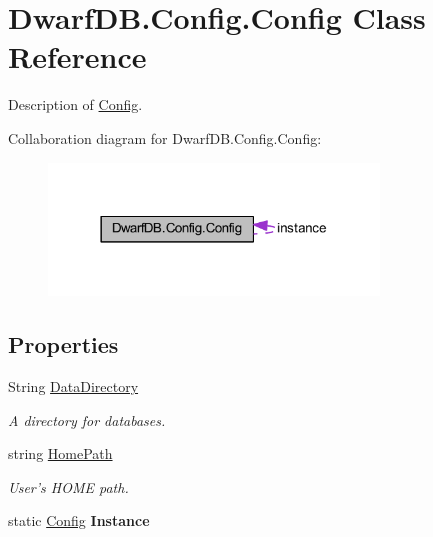 \hypertarget{class_dwarf_d_b_1_1_config_1_1_config}{
\section{DwarfDB.Config.Config Class Reference}
\label{class_dwarf_d_b_1_1_config_1_1_config}
}


Description of \hyperlink{class_dwarf_d_b_1_1_config_1_1_config}{Config}.  




Collaboration diagram for DwarfDB.Config.Config:\nopagebreak
\begin{figure}[H]
\begin{center}
\leavevmode
\includegraphics[width=249pt]{class_dwarf_d_b_1_1_config_1_1_config__coll__graph}
\end{center}
\end{figure}
\subsection*{Properties}
\begin{DoxyCompactItemize}
\item 
String \hyperlink{class_dwarf_d_b_1_1_config_1_1_config_afcb080c4360c0c344d2b9d9ecb72c297}{DataDirectory}
\begin{DoxyCompactList}\small\item\em A directory for databases. \item\end{DoxyCompactList}\item 
string \hyperlink{class_dwarf_d_b_1_1_config_1_1_config_a390a89963606ed0009489bfe8b46160d}{HomePath}
\begin{DoxyCompactList}\small\item\em User's HOME path. \item\end{DoxyCompactList}\item 
\hypertarget{class_dwarf_d_b_1_1_config_1_1_config_af1db0cd463b4f00c1a1b7fd4373b230a}{
static \hyperlink{class_dwarf_d_b_1_1_config_1_1_config}{Config} {\bfseries Instance}}
\label{class_dwarf_d_b_1_1_config_1_1_config_af1db0cd463b4f00c1a1b7fd4373b230a}

\end{DoxyCompactItemize}


